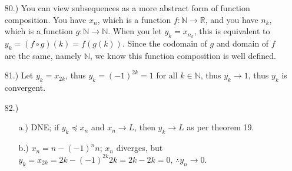 \documentclass[12pt]{article}
\begin{document}
\begin{itemize}












    \item [80.)] You can view subsequences as a more abstract form of function composition. You have $x_n$, which is a function $f:\mathbb{N}\to\mathbb{R}$, and you have $n_k$, which is a function $g:\mathbb{N}\to\mathbb{N}$. When you let $y_k=x_{n_k}$, this is equivalent to $y_k=(f\circ g)(k)=f(g(k))$. Since the codomain of $g$ and domain of $f$ are the same, namely $\mathbb{N}$, we know this function composition is well defined.

    \item [81.)] Let $y_k=x_{2k}$, thus $y_k=(-1)^{2k}=1$ for all $k\in\mathbb{N}$, thus $y_k\to1$, thus $y_k$ is convergent.

    \item [82.)] \begin{itemize}
        \item [a.)] DNE; if $y_k\preceq x_n$ and $x_n\to L$, then $y_k\to L$ as per theorem 19.

        \item [b.)] $x_n=n-(-1)^nn$; $x_n$ diverges, but $y_k=x_{2k}=2k-(-1)^{2k}2k=2k-2k=0,\,\therefore y_n\to0$.


\end{itemize}
\end{itemize}
\end{document}
